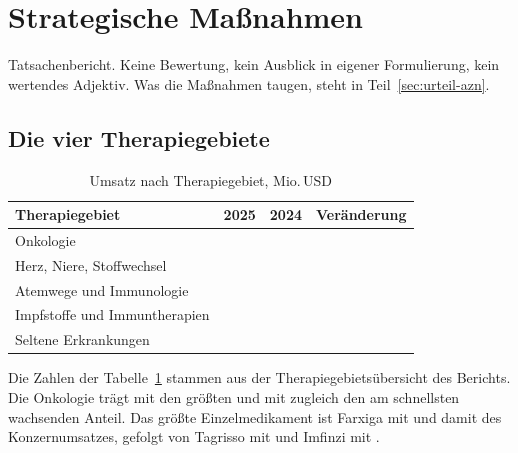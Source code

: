 \section{Strategische Ma{\ss}nahmen}
\label{sec:strategie-azn}

Tatsachenbericht. Keine Bewertung, kein Ausblick in eigener Formulierung, kein
wertendes Adjektiv. Was die Ma{\ss}nahmen taugen, steht in
Teil~\ref{sec:urteil-azn}.

\subsection{Die vier Therapiegebiete}

\begin{table}[htbp]
\centering
\caption{Umsatz nach Therapiegebiet, Mio.\,USD}
\label{tab:azn-segmente}
\begin{tabular}{lrrr}
\toprule
Therapiegebiet & 2025 & 2024 & Ver\"anderung\\
\midrule
Onkologie                        & \Betrag{\AznOnkologie} & \Betrag{\AznOnkologieVJ} & \Pct{\AznOnkologieWachstum}\\
Herz, Niere, Stoffwechsel        & \Betrag{\AznCvrm} & \Betrag{\AznCvrmVJ} & \Pct{\AznCvrmWachstum}\\
Atemwege und Immunologie         & \Betrag{\AznRespImmun} & \Betrag{\AznRespImmunVJ} & \Pct{\AznRespImmunWachstum}\\
Impfstoffe und Immuntherapien    & \Betrag{\AznImpfstoffe} & \Betrag{\AznImpfstoffeVJ} & \Pct{\AznImpfstoffeWachstum}\\
Seltene Erkrankungen             & \Betrag{\AznSeltene} & \Betrag{\AznSelteneVJ} & \Pct{\AznSelteneWachstum}\\
\bottomrule
\end{tabular}
\end{table}

Die Zahlen der Tabelle~\ref{tab:azn-segmente} stammen aus der
Therapiegebiets\"ubersicht des Berichts.
Die Onkologie tr\"agt mit \MioUSD{\AznOnkologie} den gr\"o{\ss}ten und mit
\Pct{\AznOnkologieWachstum} zugleich den am schnellsten wachsenden Anteil.
Das gr\"o{\ss}te Einzelmedikament ist Farxiga mit \MioUSD{\AznFarxiga} und
damit \Pct{\AznFarxigaAnteil} des Konzernumsatzes, gefolgt von Tagrisso mit
\MioUSD{\AznTagrisso} und Imfinzi mit
\MioUSD{\AznImfinzi}.

